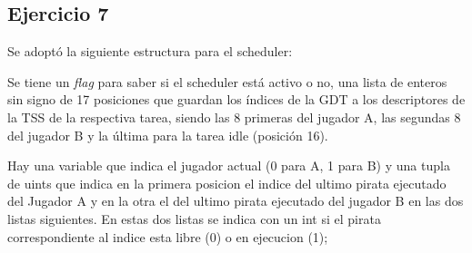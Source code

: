 \subsection{Ejercicio 7}

Se adoptó la siguiente estructura para el scheduler:

Se tiene un {\it flag\/} para saber si el scheduler está activo o no, una lista
de enteros sin signo de 17 posiciones que guardan los índices de la GDT  a los
descriptores de la TSS de la respectiva tarea, siendo las 8 primeras del jugador
A, las segundas 8 del jugador B y la última para la tarea idle (posición 16).

Hay una variable que indica el jugador actual (0 para A, 1 para B) y una tupla
de uints que indica en la primera posicion el indice del ultimo pirata ejecutado del Jugador A y en la otra el del
ultimo pirata ejecutado del jugador B en las dos listas siguientes.
En estas dos listas se indica con un int si el pirata correspondiente al indice esta libre (0) o en ejecucion (1);

